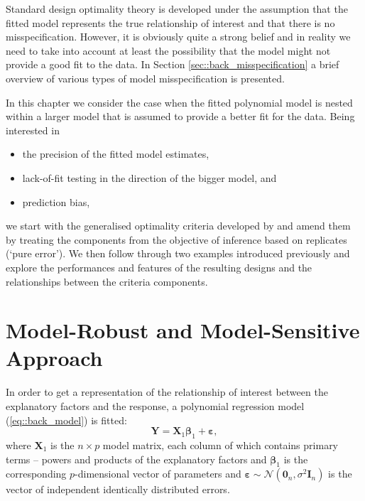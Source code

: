 Standard design optimality theory is developed under the assumption that the fitted model represents the true relationship of interest and that there is no misspecification. However, it is obviously quite a strong belief and in reality we need to take into account at least the possibility that the model might not provide a good fit to the data. In Section \ref{sec::back_misspecification} a brief overview of various types of model misspecification is presented. 

In this chapter we consider the case when the fitted polynomial model is nested within a larger model that is assumed to provide a better fit for the data. %
Being interested in
\begin{itemize}
\item the precision of the fitted model estimates,
\item lack-of-fit testing in the direction of the bigger model, and
\item prediction bias,
\end{itemize}
we start with the generalised optimality criteria developed by \cite{Goos2005model} and amend them by treating the components from the objective of inference based on replicates (`pure error'). We then follow through two examples introduced previously and explore the performances and features of the resulting designs and the relationships between the criteria components.

\section{Model-Robust and Model-Sensitive Approach}
In order to get a representation of the relationship of interest between the explanatory factors and the response, a polynomial regression model (\ref{eq::back_model}) is fitted:
\begin{equation}
\label{eq::fitted_model}
\bm{Y}=\bm{X}_1\bm{\beta}_1+\bm{\varepsilon},
\end{equation}
where $\bm{X}_1$ is the $n\times p$ model matrix, each column of which contains primary terms -- powers and products of the explanatory factors and $\bm{\beta}_1$ is the corresponding $p$-dimensional vector of parameters and $\bm{\varepsilon}\sim \mathcal{N}(\bm{0}_{n},\sigma^{2}\bm{I}_{n})$ is the vector of independent identically distributed errors.

